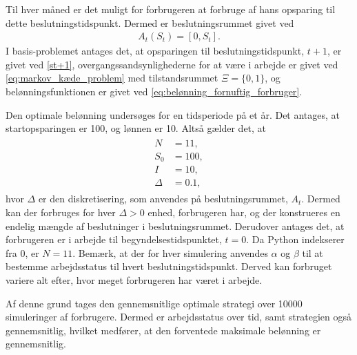 Til hver måned er det muligt for forbrugeren at forbruge af hans opsparing til dette beslutningstidspunkt. Dermed er beslutningsrummet givet ved
\begin{align*}
    A_t(S_t) = \left[0, S_t\right].
\end{align*}
%
I basis-problemet antages det, at opsparingen til beslutningstidspunkt, $t+1$, er givet ved \eqref{st+1}, overgangssandsynlighederne for at være i arbejde er givet ved \eqref{eq:markov_kæde_problem} med tilstandsrummet $\Xi = \{0,1\}$, og belønningsfunktionen er givet ved \eqref{eq:belønning_fornuftig_forbruger}.

Den optimale belønning undersøges for en tidsperiode på et år. Det antages, at startopsparingen er 100, og lønnen er 10. Altså gælder det, at
\begin{align}\label{damdamdam..}
\begin{split}
    N &= 11,\\
    S_0 &= 100,\\
    I &= 10,\\
    \Delta &= 0.1,
    \end{split}
\end{align}
hvor $\Delta$ er den diskretisering, som anvendes på beslutningsrummet, $A_t$. Dermed kan der forbruges for hver $\Delta>0$ enhed, forbrugeren har, og der konstrueres en endelig mængde af beslutninger i beslutningsrummet. Derudover antages det, at forbrugeren er i arbejde til begyndelsestidspunktet, $t=0$. Da Python indekserer fra 0, er $N=11$. Bemærk, at der for hver simulering anvendes $\alpha$ og $\beta$ til at bestemme arbejdsstatus til hvert beslutningstidspunkt. Derved kan forbruget variere alt efter, hvor meget forbrugeren har været i arbejde. 








Af denne grund tages den gennemsnitlige optimale strategi over 10000 simuleringer af forbrugere. Dermed er arbejdsstatus over tid, samt strategien også gennemsnitlig, hvilket medfører, at den forventede maksimale belønning er gennemsnitlig. 

